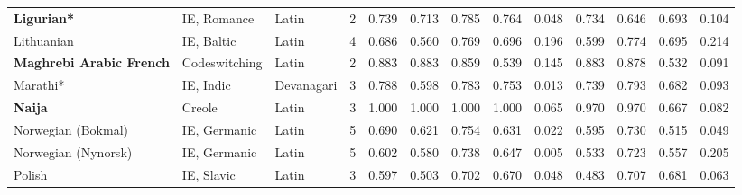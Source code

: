 \begin{tabular}{lllrrrrrrrrrr}
             \textbf{Ligurian*} &                     IE, Romance &      Latin &         2 &                       0.739 &                         0.713 &         0.785 &                  0.764 &            0.048 &                         0.734 &         0.646 &                  0.693 &            0.104 \\
                     Lithuanian &                      IE, Baltic &      Latin &         4 &                       0.686 &                         0.560 &         0.769 &                  0.696 &            0.196 &                         0.599 &         0.774 &                  0.695 &            0.214 \\
\textbf{Maghrebi Arabic French} &                   Codeswitching &      Latin &         2 &                       0.883 &                         0.883 &         0.859 &                  0.539 &            0.145 &                         0.883 &         0.878 &                  0.532 &            0.091 \\
                       Marathi* &                       IE, Indic & Devanagari &         3 &                       0.788 &                         0.598 &         0.783 &                  0.753 &            0.013 &                         0.739 &         0.793 &                  0.682 &            0.093 \\
                 \textbf{Naija} &                          Creole &      Latin &         3 &                       1.000 &                         1.000 &         1.000 &                  1.000 &            0.065 &                         0.970 &         0.970 &                  0.667 &            0.082 \\
             Norwegian (Bokmal) &                    IE, Germanic &      Latin &         5 &                       0.690 &                         0.621 &         0.754 &                  0.631 &            0.022 &                         0.595 &         0.730 &                  0.515 &            0.049 \\
            Norwegian (Nynorsk) &                    IE, Germanic &      Latin &         5 &                       0.602 &                         0.580 &         0.738 &                  0.647 &            0.005 &                         0.533 &         0.723 &                  0.557 &            0.205 \\
                         Polish &                      IE, Slavic &      Latin &         3 &                       0.597 &                         0.503 &         0.702 &                  0.670 &            0.048 &                         0.483 &         0.707 &                  0.681 &            0.063 \\

\end{tabular}
